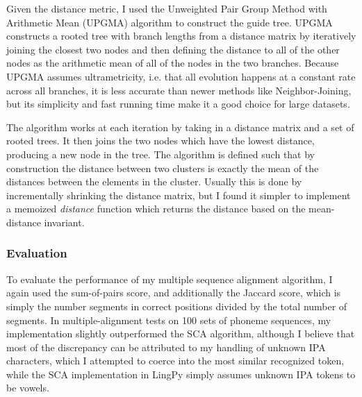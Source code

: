 \documentclass[doc,natbib,11pt]{apa6}
\begin{document}
Given the distance metric, I used the Unweighted Pair Group Method with Arithmetic Mean (UPGMA) algorithm to construct the guide tree. UPGMA constructs a rooted tree with branch lengths from a distance matrix by iteratively joining the closest two nodes and then defining the distance to all of the other nodes as the arithmetic mean of all of the nodes in the two branches. Because UPGMA assumes ultrametricity, i.e. that all evolution happens at a constant rate across all branches, it is less accurate than newer methods like Neighbor-Joining, but its simplicity and fast running time make it a good choice for large datasets.

The algorithm works at each iteration by taking in a distance matrix  and a set of rooted trees. It then joins the two nodes which have the lowest distance, producing a new node in the tree. The algorithm is defined such that by construction the distance between two clusters is exactly the mean of the distances between the elements in the cluster. Usually this is done by incrementally shrinking the distance matrix, but I found it simpler to implement a memoized \emph{distance} function which returns the distance based on the mean-distance invariant. 

\subsubsection{Evaluation}

To evaluate the performance of my multiple sequence alignment algorithm, I again used the sum-of-pairs score, and additionally the Jaccard score, which is simply the number segments in correct positions divided by the total number of segments. In multiple-alignment tests on 100 sets of phoneme sequences, my implementation slightly outperformed the SCA algorithm, although I believe that most of the discrepancy can be attributed to my handling of unknown IPA characters, which I attempted to coerce into the most similar recognized token, while the SCA implementation in LingPy simply assumes unknown IPA tokens to be vowels. 


\begin{table}[h]
\end{table}
\end{document}
